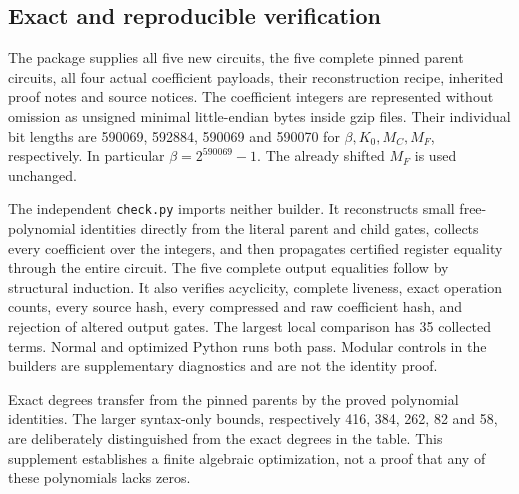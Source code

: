\subsection{Exact and reproducible verification}
The package supplies all five new circuits, the five complete pinned
parent circuits, all four actual coefficient payloads, their reconstruction
recipe, inherited proof notes and source notices. The coefficient integers
are represented without omission as unsigned minimal little-endian bytes
inside gzip files. Their individual bit lengths are 590069, 592884, 590069
and 590070 for $\beta,K_0,M_C,M_F$, respectively. In particular
$\beta=2^{590069}-1$. The already shifted $M_F$ is used unchanged.

The independent \texttt{check.py} imports neither builder. It reconstructs
small free-polynomial identities directly from the literal parent and child
gates, collects every coefficient over the integers, and then propagates
certified register equality through the entire circuit. The five complete
output equalities follow by structural induction. It also verifies
acyclicity, complete liveness, exact operation counts, every source hash,
every compressed and raw coefficient hash, and rejection of altered output
gates. The largest local comparison has 35 collected terms. Normal and
optimized Python runs both pass. Modular controls in the builders are
supplementary diagnostics and are not the identity proof.

Exact degrees transfer from the pinned parents by the proved polynomial
identities. The larger syntax-only bounds, respectively 416, 384, 262, 82
and 58, are deliberately distinguished from the exact degrees in the table.
This supplement establishes a finite algebraic optimization, not a proof
that any of these polynomials lacks zeros.
